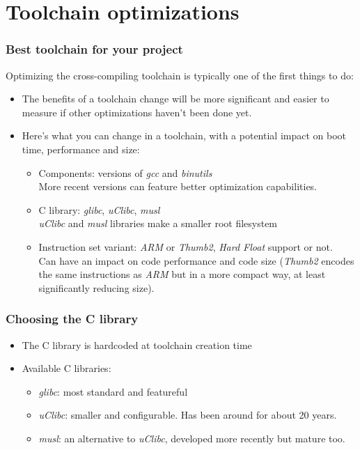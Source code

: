 \section{Toolchain optimizations}

\begin{frame}
\frametitle{Best toolchain for your project}
Optimizing the cross-compiling toolchain is typically one of the first
things to do:
\begin{itemize}
  \item The benefits of a toolchain change will be more significant and easier to
        measure if other optimizations haven't been done yet.
  \item Here's what you can change in a toolchain, with a potential
        impact on boot time, performance and size:
  \begin{itemize}
    \item Components: versions of {\em gcc} and {\em binutils}\\
	  More recent versions can feature better optimization capabilities.
    \item C library: {\em glibc}, {\em uClibc}, {\em musl}\\
	  {\em uClibc} and {\em musl} libraries make a smaller root
	  filesystem
    \item Instruction set variant: {\em ARM} or {\em Thumb2}, {\em Hard
          Float} support or not.\\
	  Can have an impact on code performance and code size ({\em Thumb2}
	  encodes the same instructions as {\em ARM} but in a more
	  compact way, at least significantly reducing size).
  \end{itemize}
\end{itemize}
\end{frame}

\begin{frame}
\frametitle{Choosing the C library}
\begin{itemize}
  \item The C library is hardcoded at toolchain creation time
  \item Available C libraries:
  \begin{itemize}
    \item {\em glibc}: most standard and featureful
    \item {\em uClibc}: smaller and configurable. Has been around for
	about 20 years.
    \item {\em musl}: an alternative to {\em uClibc}, developed more
        recently but mature too.
  \end{itemize}
\end{itemize}
\end{frame}

